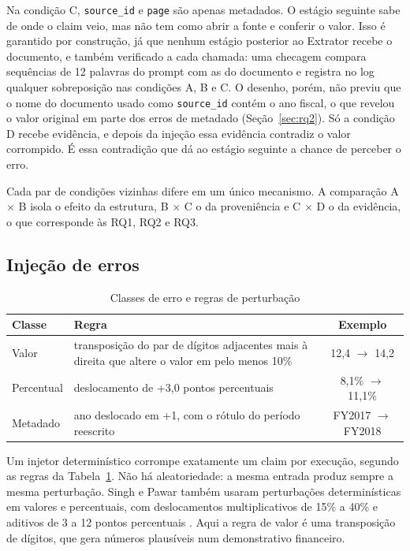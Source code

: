 Na condição C, \texttt{source\_id} e \texttt{page} são apenas metadados.
O estágio seguinte sabe de onde o claim veio, mas não tem como abrir a fonte e conferir o valor.
Isso é garantido por construção, já que nenhum estágio posterior ao Extrator recebe o documento, e também verificado a cada chamada: uma checagem compara sequências de 12 palavras do prompt com as do documento e registra no log qualquer sobreposição nas condições A, B e C.
O desenho, porém, não previu que o nome do documento usado como \texttt{source\_id} contém o ano fiscal, o que revelou o valor original em parte dos erros de metadado (Seção~\ref{sec:rq2}).
Só a condição D recebe evidência, e depois da injeção essa evidência contradiz o valor corrompido.
É essa contradição que dá ao estágio seguinte a chance de perceber o erro.

Cada par de condições vizinhas difere em um único mecanismo.
A comparação A $\times$ B isola o efeito da estrutura, B $\times$ C o da proveniência e C $\times$ D o da evidência, o que corresponde às RQ1, RQ2 e RQ3.

\subsection{Injeção de erros}\label{sec:injecao}

\begin{table}[htbp]
\caption{Classes de erro e regras de perturbação}
\label{tab:injecao}
\centering
\footnotesize
\setlength{\tabcolsep}{4pt}
\begin{tabular}{|l|p{3.7cm}|c|}
\hline
\textbf{Classe} & \textbf{Regra} & \textbf{Exemplo} \\
\hline
Valor & transposição do par de dígitos adjacentes mais à direita que altere o valor em pelo menos 10\% & 12,4 $\rightarrow$ 14,2 \\
\hline
Percentual & deslocamento de +3,0 pontos percentuais & 8,1\% $\rightarrow$ 11,1\% \\
\hline
Metadado & ano deslocado em +1, com o rótulo do período reescrito & FY2017 $\rightarrow$ FY2018 \\
\hline
\end{tabular}
\end{table}

Um injetor determinístico corrompe exatamente um claim por execução, segundo as regras da Tabela~\ref{tab:injecao}.
Não há aleatoriedade: a mesma entrada produz sempre a mesma perturbação.
Singh e Pawar também usaram perturbações determinísticas em valores e percentuais, com deslocamentos multiplicativos de 15\% a 40\% e aditivos de 3 a 12 pontos percentuais \cite{singh2026snowball}.
Aqui a regra de valor é uma transposição de dígitos, que gera números plausíveis num demonstrativo financeiro.


